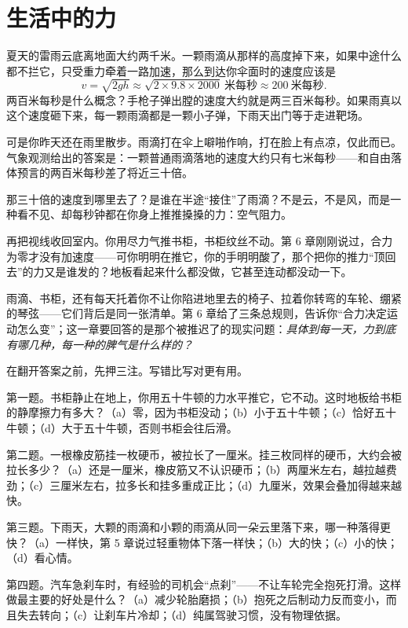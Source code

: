 \chapter{生活中的力}


\begin{mainline}
夏天的雷雨云底离地面大约两千米。一颗雨滴从那样的高度掉下来，如果中途什么都不拦它，只受重力牵着一路加速，那么到达你伞面时的速度应该是
\[
v=\sqrt{2gh}\approx\sqrt{2\times9.8\times2000}\ \text{米每秒}\approx 200\ \text{米每秒}.
\]
两百米每秒是什么概念？手枪子弹出膛的速度大约就是两三百米每秒。如果雨真以这个速度砸下来，每一颗雨滴都是一颗小子弹，下雨天出门等于走进靶场。

可是你昨天还在雨里散步。雨滴打在伞上噼啪作响，打在脸上有点凉，仅此而已。气象观测给出的答案是：一颗普通雨滴落地的速度大约只有七米每秒——和自由落体预言的两百米每秒差了将近三十倍。

那三十倍的速度到哪里去了？是谁在半途“接住”了雨滴？不是云，不是风，而是一种看不见、却每秒钟都在你身上推推搡搡的力：空气阻力。

再把视线收回室内。你用尽力气推书柜，书柜纹丝不动。第 6 章刚刚说过，合力为零才没有加速度——可你明明在推它，你的手明明酸了，那个把你的推力“顶回去”的力又是谁发的？地板看起来什么都没做，它甚至连动都没动一下。

雨滴、书柜，还有每天托着你不让你陷进地里去的椅子、拉着你转弯的车轮、绷紧的琴弦——它们背后是同一张清单。第 6 章给了三条总规则，告诉你“合力决定运动怎么变”；这一章要回答的是那个被推迟了的现实问题：\emph{具体到每一天，力到底有哪几种，每一种的脾气是什么样的？}
\end{mainline}


在翻开答案之前，先押三注。写错比写对更有用。

第一题。书柜静止在地上，你用五十牛顿的力水平推它，它不动。这时地板给书柜的静摩擦力有多大？（a）零，因为书柜没动；（b）小于五十牛顿；（c）恰好五十牛顿；（d）大于五十牛顿，否则书柜会往后滑。

第二题。一根橡皮筋挂一枚硬币，被拉长了一厘米。挂三枚同样的硬币，大约会被拉长多少？（a）还是一厘米，橡皮筋又不认识硬币；（b）两厘米左右，越拉越费劲；（c）三厘米左右，拉多长和挂多重成正比；（d）九厘米，效果会叠加得越来越快。

第三题。下雨天，大颗的雨滴和小颗的雨滴从同一朵云里落下来，哪一种落得更快？（a）一样快，第 5 章说过轻重物体下落一样快；（b）大的快；（c）小的快；（d）看心情。

第四题。汽车急刹车时，有经验的司机会“点刹”——不让车轮完全抱死打滑。这样做最主要的好处是什么？（a）减少轮胎磨损；（b）抱死之后制动力反而变小，而且失去转向；（c）让刹车片冷却；（d）纯属驾驶习惯，没有物理依据。

